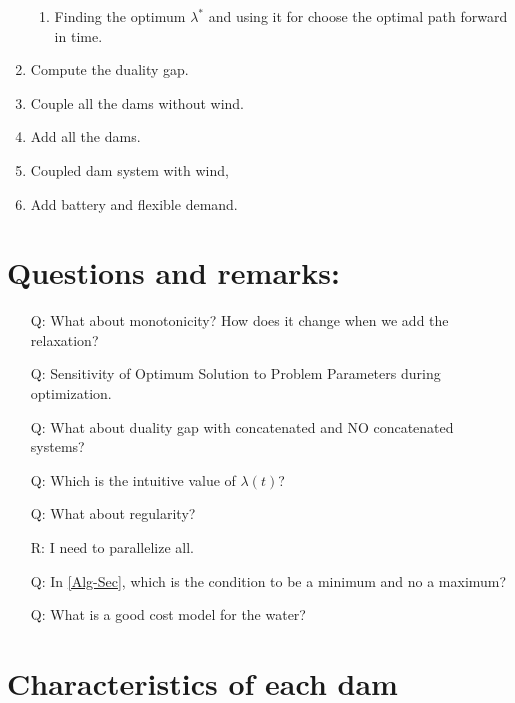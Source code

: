 \documentclass[12pt]{article}
\theoremstyle{definition}
\theoremstyle{remark}
\begin{document}
\begin{enumerate}
\begin{enumerate}
\item Finding the optimum $\lambda^*$ and using it for choose the optimal path forward in time.

\end{enumerate}

\item Compute the duality gap.

\item Couple all the dams without wind.

\item Add all the dams.

\item Coupled dam system with wind,

\item Add battery and flexible demand.

\end{enumerate}

\section{Questions and remarks:}

\begin{enumerate}
\item[Q:] What about monotonicity? How does it change when we add the relaxation?

\item[Q:] Sensitivity of Optimum Solution to Problem Parameters during optimization.

\item[Q:] What about duality gap with concatenated and NO concatenated systems?

\item[Q:] Which is the intuitive value of $\lambda(t)$?

\item[Q:] What about regularity?

\item[R:] I need to parallelize all.

\item[Q:] In \ref{Alg-Sec}, which is the condition to be a minimum and no a maximum?

\item[Q:] What is a good cost model for the water?
\end{enumerate}

\section{Characteristics of each dam}
\end{document}
